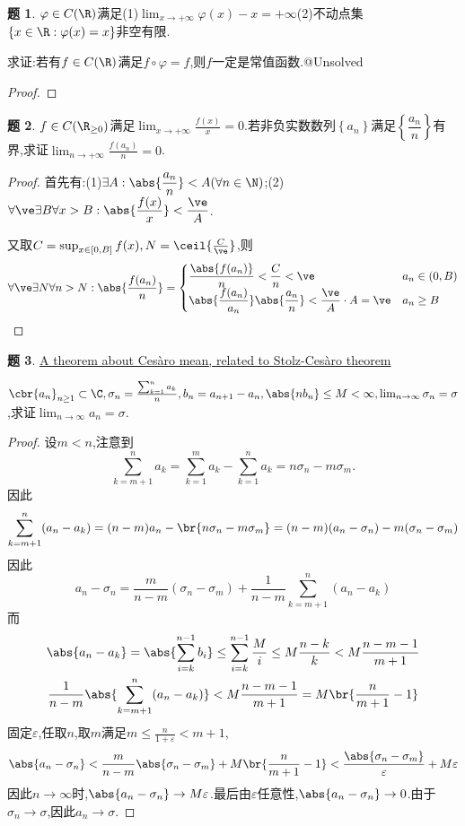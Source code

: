 \documentclass{article}
\theoremstyle{definition}
\newtheorem{exercise}{题}[section]
\begin{document}
\begin{exercise}
    $\varphi\in C(\R)$满足(1)$\lim_{x\to+\infty}\varphi(x)-x=+\infty$(2)不动点集$\{x\in \R:\varphi(x)=x\}$非空有限.

    求证:若有$f\in C(\R)$满足$f \circ\varphi=f$,则$f$一定是常值函数.@Unsolved
\end{exercise}
\begin{proof}
    
\end{proof}

\begin{exercise}
    $f\in C(\R_{\geq 0})$满足$\lim_{x\to+\infty}\frac{f(x)}{x}=0$.若非负实数数列$\left\{a_n\right\}$满足$\left\{\dfrac{a_n}{n}\right\}$有界,求证$\lim_{n\to+\infty}\frac{f(a_n)}{n}=0$.
\end{exercise}
\begin{proof}
    首先有:(1)$\exists A:\abs{\dfrac{a_n}{n}}<A(\forall n\in \N)$;(2)$\forall \ve\exists B\forall x>B:\abs{\dfrac{f(x)}{x}}<\dfrac{\ve}{A}$.

    又取$ C=\sup_{x\in [0,B]}f(x), N=\ceil{\frac{C}{\ve}}$,则
    $$\forall \ve\exists N\forall n>N:\abs{\frac{f(a_n)}{n}}=\begin{cases}
    \dfrac{\abs{f(a_n)}}{n}<\dfrac{C}{n}<\ve&a_n\in (0,B)\\
    \abs{\dfrac{f(a_n)}{a_n}}\abs{\dfrac{a_n}{n}}<\dfrac{\ve}{A}\cdot A=\ve&a_n\geq B
    \end{cases}$$
\end{proof}

\begin{exercise}
    \href{https://math.stackexchange.com/questions/294224/a-theorem-about-ces%c3%a0ro-mean-related-to-stolz-ces%c3%a0ro-theorem}{A theorem about Ces\`aro mean, related to Stolz-Ces\`aro theorem}

    $\cbr{a_n}_{n\geq 1}\subset \C, \sigma_n=\frac{\sum_{k=1}^n a_k}{n},b_n=a_{n+1}-a_n, \abs{nb_n}\leq M<\infty, \lim_{n\to \infty}\sigma_n=\sigma$,求证$\lim_{n\to \infty}a_n=\sigma$.
\end{exercise}
\begin{proof}
    设$m<n$,注意到$$\sum_{k=m+1}^na_k=\sum_{k=1}^ma_k-\sum^n_{k=1}a_k=n\sigma_n-m\sigma_m.$$
    因此$$\sum_{k=m+1}^n(a_n-a_k)=(n-m)a_n-\br{n\sigma_n-m\sigma_m}=(n-m)(a_n-\sigma_n)-m(\sigma_n-\sigma_m)$$
    因此$$a_n-\sigma_n=\frac{m}{n-m}(\sigma_n-\sigma_m)+\frac{1}{n-m}\sum_{k=m+1}^n(a_n-a_k)$$
    而$$\begin{gathered}
        \abs{a_n-a_k}=\abs{\sum_{i=k}^{n-1}b_i}\leq \sum_{i=k}^{n-1}\frac{M}{i}\leq M\frac{n-k}{k}<M\frac{n-m-1}{m+1}\\
        \frac{1}{n-m}\abs{\sum_{k=m+1}^n(a_n-a_k)}< M\frac{n-m-1}{m+1}=M\br{\frac{n}{m+1}-1}
    \end{gathered}$$
    固定$\varepsilon$,任取$n$,取$m$满足$m\leq \frac{n}{1+\varepsilon}<m+1$,$$\abs{a_n-\sigma_n}<\frac{m}{n-m}\abs{\sigma_n-\sigma_m}+M\br{\frac{n}{m+1}-1}<\frac{\abs{\sigma_n-\sigma_m}}{\varepsilon}+M\varepsilon$$
    因此$n\to \infty$时,$\abs{a_n-\sigma_n}\to M\varepsilon$.最后由$\varepsilon$任意性,$\abs{a_n-\sigma_n}\to 0$.由于$\sigma_n\to \sigma$,因此$a_n\to \sigma$.
\end{proof}
\end{document}
